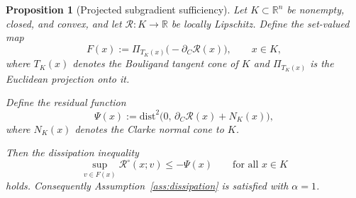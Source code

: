 \documentclass[10pt,a4paper]{amsart}
\newtheorem{proposition}{Proposition}
\begin{document}
\begin{proposition}[Projected subgradient sufficiency]
\label{prop:dissipation_sufficient}
Let $K\subset\mathbb{R}^n$ be nonempty, closed, and convex, and let
$\mathcal R:K\to\mathbb{R}$ be locally Lipschitz.
Define the set-valued map
\begin{equation}
F(x)
:=
\Pi_{T_K(x)}\!\big(-\partial_C \mathcal R(x)\big),
\qquad x\in K,
\label{eq:projected_subgradient}
\end{equation}
where $T_K(x)$ denotes the Bouligand tangent cone of $K$ and
$\Pi_{T_K(x)}$ is the Euclidean projection onto it.

Define the residual function
\begin{equation}
\Psi(x)
:=
\mathrm{dist}^2\!\big(
0,\,
\partial_C \mathcal R(x)+N_K(x)
\big),
\label{eq:KKT_residual}
\end{equation}
where $N_K(x)$ denotes the Clarke normal cone to $K$.

Then the dissipation inequality
\begin{equation}
\sup_{v\in F(x)}
\mathcal R^\circ(x;v)
\le
-\Psi(x)
\qquad \text{for all } x\in K
\label{eq:dissipation_result}
\end{equation}
holds.
Consequently Assumption~\ref{ass:dissipation}
is satisfied with $\alpha=1$.
\end{proposition}
\end{document}
